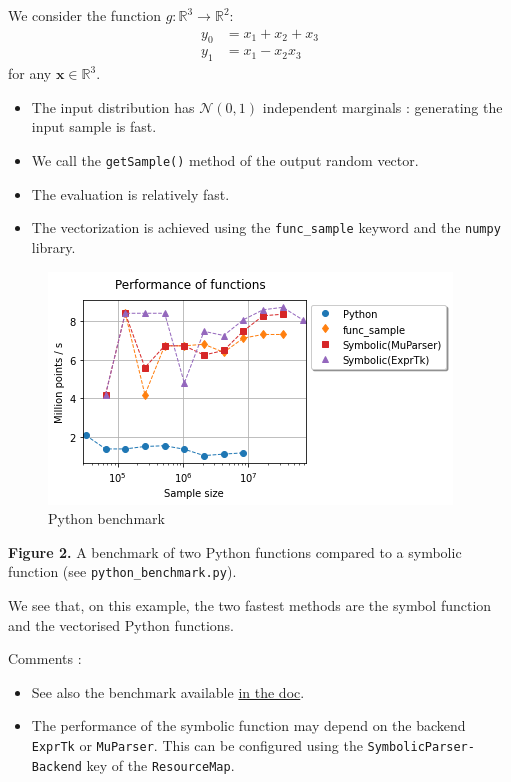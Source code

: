 \documentclass[11pt]{article}
\providecommand{\tightlist}{%
      \setlength{\itemsep}{0pt}\setlength{\parskip}{0pt}}
\begin{document}
We consider the function \(g : \mathbb{R}^3 \rightarrow \mathbb{R}^2\):
\[
\begin{aligned}
    y_0 &= x_1 + x_2 + x_3 \\
    y_1 &= x_1 - x_2 x_3
\end{aligned}
\] for any \(\boldsymbol{x}\in \mathbb{R}^3\).

\begin{itemize}
\tightlist
\item
  The input distribution has \(\mathcal{N}(0,1)\) independent marginals
  : generating the input sample is fast.
\item
  We call the \texttt{getSample()} method of the output random vector.
\item
  The evaluation is relatively fast.
\item
  The vectorization is achieved using the \texttt{func\_sample} keyword
  and the \texttt{numpy} library.
\end{itemize}

    \begin{figure}
\centering
\includegraphics{wrapper-python-benchmark.png}
\caption{Python benchmark}
\end{figure}

\textbf{Figure 2.} A benchmark of two Python functions compared to a symbolic
function (see \texttt{python\_benchmark.py}).

We see that, on this example, the two fastest methods are the symbol
function and the vectorised Python functions.

    Comments :

\begin{itemize}
\item
  See also the benchmark available
  \href{https://openturns.github.io/openturns/latest/developer_guide/wrapper_development.html\#performance-considerations}{in
  the doc}.
\item
  The performance of the symbolic function may depend on the backend
  \texttt{ExprTk} or \texttt{MuParser}. This can be configured using the
  \texttt{SymbolicParser-Backend} key of the \texttt{ResourceMap}.
\end{itemize}
\end{document}
